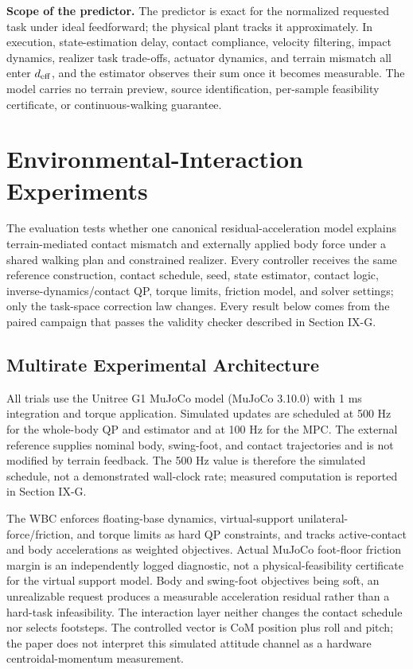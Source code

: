 \documentclass[journal]{IEEEtran}
\theoremstyle{plain}
\theoremstyle{definition}
\begin{document}
\textbf{Scope of the predictor.} The predictor is exact for the normalized requested task under ideal feedforward; the physical plant tracks it approximately. In execution, state-estimation delay, contact compliance, velocity filtering, impact dynamics, realizer task trade-offs, actuator dynamics, and terrain mismatch all enter \(d_{\rm eff}\), and the estimator observes their sum once it becomes measurable. The model carries no terrain preview, source identification, per-sample feasibility certificate, or continuous-walking guarantee.

\section{Environmental-Interaction Experiments}\label{sec:experiments}

The evaluation tests whether one canonical residual-acceleration model explains terrain-mediated contact mismatch and externally applied body force under a shared walking plan and constrained realizer. Every controller receives the same reference construction, contact schedule, seed, state estimator, contact logic, inverse-dynamics/contact QP, torque limits, friction model, and solver settings; only the task-space correction law changes. Every result below comes from the paired campaign that passes the validity checker described in Section IX-G.

\subsection{Multirate Experimental Architecture}

All trials use the Unitree G1 MuJoCo model (MuJoCo 3.10.0) with 1 ms integration and torque application. Simulated updates are scheduled at 500 Hz for the whole-body QP and estimator and at 100 Hz for the MPC. The external reference supplies nominal body, swing-foot, and contact trajectories and is not modified by terrain feedback. The 500 Hz value is therefore the simulated schedule, not a demonstrated wall-clock rate; measured computation is reported in Section IX-G.

The WBC enforces floating-base dynamics, virtual-support unilateral-force/friction, and torque limits as hard QP constraints, and tracks active-contact and body accelerations as weighted objectives. Actual MuJoCo foot-floor friction margin is an independently logged diagnostic, not a physical-feasibility certificate for the virtual support model. Body and swing-foot objectives being soft, an unrealizable request produces a measurable acceleration residual rather than a hard-task infeasibility. The interaction layer neither changes the contact schedule nor selects footsteps. The controlled vector is CoM position plus roll and pitch; the paper does not interpret this simulated attitude channel as a hardware centroidal-momentum measurement.
\end{document}
